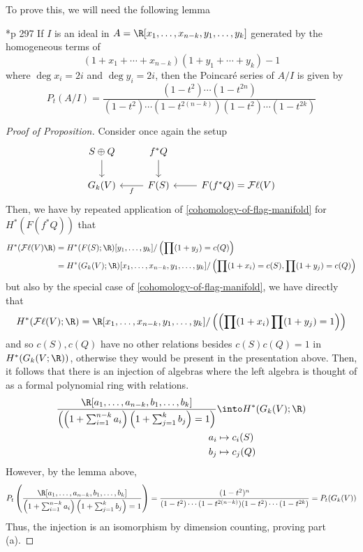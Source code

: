 \documentclass[11pt,leqno,oneside]{amsbook}
\numberwithin{thm}{section}
\newcommand{\Fl}{\mathcal{F\ell}}
\begin{document}
To prove this, we will need the following lemma
\begin{lem}
  \cite{bott-tu}*{p 297} If \(I\) is an ideal in \(A = \R[x_1, \ldots,
  x_{n-k}, y_1, \ldots, 
  y_k]\) generated by the homogeneous terms of \[
    (1+x_1+\cdots + x_{n-k})(1+y_1+\cdots+y_k)-1
  \]
  where \(\deg x_i = 2i\) and \(\deg y_i = 2i\), then the Poincar\'{e}
  series of \(A/I\) is given by \[
    P_t(A/I) = \frac{(1-t^2) \cdots (1-t^{2n})}{(1-t^2) \cdots
      (1-t^{2(n-k)})(1-t^2) \cdots (1-t^{2k})}
  \]
\end{lem}
\begin{proof}[Proof of Proposition]
  Consider once again the setup \[
    \begin{tikzcd}
      S \oplus Q \ar[d]& f^*Q \ar[d]\\
      G_k(V) & \ar[l,"f"] F(S) & \ar[l] F(f^*Q) = \Fl(V)
    \end{tikzcd}
  \]
  Then, we have by repeated application of
  \ref{cohomology-of-flag-manifold} for \(H^*(F(f^*Q))\) that
  \begin{align*}
    H^*(\Fl(V)\R)
    & = H^*(F(S);\R)[y_1, \ldots, y_k]/\left( \prod (1+y_j) = c(Q)
      \right)\\
    & = H^*(G_k(V);\R)[x_1, \ldots, x_{n-k}, y_1, \ldots, y_k]/\left(
      \prod (1+x_i) = c(S), \prod (1+y_j) = c(Q) \right)
  \end{align*}
  but also by the special case of \ref{cohomology-of-flag-manifold},
  we have directly that \[
    H^*(\Fl(V);\R) = \R[x_1, \ldots, x_{n-k}, y_1, \ldots, y_k] / \left(\left(
      \prod (1+x_i) \prod (1+y_j) = 1 \right)\right)
  \]
  and so \(c(S), c(Q)\) have no other relations besides \(c(S)c(Q) =
  1\) in \(H^*(G_k(V;\R))\), otherwise they would be present in the
  presentation above. Then, it follows that there is an 
  injection of algebras where the left algebra is thought of as a formal polynomial
  ring with relations.
  \begin{align*}
    \frac{\R[a_1, \ldots, a_{n-k}, b_1, \ldots, b_{k}]}{\left(\left(
    1+\sum_{i=1}^{n-k} a_i \right)\left( 1+\sum_{j=1}^k b_j \right) = 1\right)}
    & \into H^*(G_k(V);\R)\\
    a_i & \mapsto c_i(S)\\
    b_j & \mapsto c_j(Q)
  \end{align*}
  However, by the lemma above, \[
    P_t\left( \frac{\R[a_1, \ldots, a_{n-k}, b_1, \ldots, b_{k}]}{\left(
    1+\sum_{i=1}^{n-k} a_i \right)\left( 1+\sum_{j=1}^k b_j \right) = 1}
  \right) =
    \frac{(1-t^2)^n}{(1-t^2) \cdots (1-t^{2(n-k)})(1-t^2) \cdots
      (1-t^{2k})} = P_t(G_k(V))
  \]
  Thus, the injection is an isomorphism by dimension counting, proving
  part (a).


\end{proof}
\end{document}
